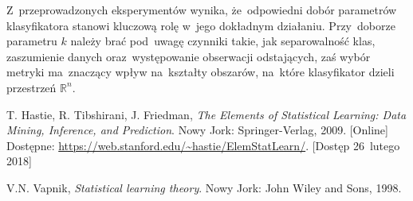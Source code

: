 \documentclass[11pt,a4paper]{article}
\begin{document}
Z~przeprowadzonych eksperymentów wynika, że~odpowiedni dobór parametrów klasyfikatora stanowi kluczową rolę w~jego dokładnym działaniu.
Przy~doborze parametru $k$ należy brać pod~uwagę czynniki takie, jak separowalność klas, zaszumienie danych oraz~występowanie obserwacji odstających, zaś wybór metryki ma~znaczący wpływ na~kształty obszarów, na~które klasyfikator dzieli przestrzeń $\mathbb{R}^n$.

\begin{thebibliography}{9}

        T. Hastie,
        R. Tibshirani,
        J. Friedman,
        \emph{The Elements of Statistical Learning: Data Mining, Inference, and Prediction}.
        Nowy Jork: Springer-Verlag,
        2009.
        [Online] \\
        Dostępne: \url{https://web.stanford.edu/~hastie/ElemStatLearn/}.
        [Dostęp 26~lutego 2018]

        V.N. Vapnik,
        \emph{Statistical learning theory}.
        Nowy Jork: John Wiley and Sons,
        1998.

\end{thebibliography}
\end{document}
